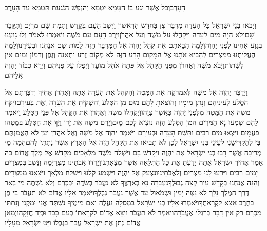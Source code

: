 \documentclass[../main/main.tex]{subfiles}
\begin{document}
\begin{multicols*}{\ncols}
הָעָרֶב\PreVerseSpace{}וְכֹל אֲשֶׁר יִגַּע בּוֹ הַטָּמֵא יִטְמָא וְהַנֶּפֶשׁ הַנֹּגַעַת תִּטְמָא עַד הָעָרֶב\OpenSection{}\par
{}וַיָּבֹאוּ בְנֵי יִשְׂרָאֵל כָּל הָעֵדָה מִדְבַּר צִן בַּחֹדֶשׁ הָרִאשׁוֹן וַיֵּשֶׁב הָעָם בְּקָדֵשׁ וַתָּמָת שָׁם מִרְיָם וַתִּקָּבֵר שָׁם\PreVerseSpace{}וְלֹא הָיָה מַיִם לָעֵדָה וַיִּקָּהֲלוּ עַל מֹשֶׁה וְעַל אַהֲרֹן\PreVerseSpace{}וַיָּרֶב הָעָם עִם מֹשֶׁה וַיֹּאמְרוּ לֵאמֹר וְלוּ גָוַעְנוּ בִּגְוַע אַחֵינוּ לִפְנֵי יַהְוֶה\PreVerseSpace{}וְלָמָה הֲבֵאתֶם אֶת קְהַל יַהְוֶה אֶל הַמִּדְבָּר הַזֶּה לָמוּת שָׁם אֲנַחְנוּ וּבְעִירֵנוּ\PreVerseSpace{}וְלָמָה הֶעֱלִיתֻנוּ מִמִּצְרַיִם לְהָבִיא אֹתָנוּ אֶל הַמָּקוֹם הָרָע הַזֶּה לֹא מְקוֹם זֶרַע וּתְאֵנָה וְגֶפֶן וְרִמּוֹן וּמַיִם אַיִן לִשְׁתּוֹת\PreVerseSpace{}וַיָּבֹא מֹשֶׁה וְאַהֲרֹן מִפְּנֵי הַקָּהָל אֶל פֶּתַח אֹהֶל מוֹעֵד וַיִּפְּלוּ עַל פְּנֵיהֶם וַיֵּרָא כְבוֹד יַהְוֶה אֲלֵיהֶם\OpenSection{}\par
{}וַיְדַבֵּר יַהְוֶה אֶל מֹשֶׁה לֵּאמֹר\PreVerseSpace{}קַח אֶת הַמַּטֶּה וְהַקְהֵל אֶת הָעֵדָה אַתָּה וְאַהֲרֹן אָחִיךָ וְדִבַּרְתֶּם אֶל הַסֶּלַע לְעֵינֵיהֶם וְנָתַן מֵימָיו וְהוֹצֵאתָ לָהֶם מַיִם מִן הַסֶּלַע וְהִשְׁקִיתָ אֶת הָעֵדָה וְאֶת בְּעִירָם\PreVerseSpace{}וַיִּקַּח מֹשֶׁה אֶת הַמַּטֶּה מִלִּפְנֵי יַהְוֶה כַּאֲשֶׁר צִוָּהוּ\PreVerseSpace{}וַיַּקְהִלוּ מֹשֶׁה וְאַהֲרֹן אֶת הַקָּהָל אֶל פְּנֵי הַסָּלַע וַיֹּאמֶר לָהֶם שִׁמְעוּ נָא הַמֹּרִים הֲמִן הַסֶּלַע הַזֶּה נוֹצִיא לָכֶם מָיִם\PreVerseSpace{}וַיָּרֶם מֹשֶׁה אֶת יָדוֹ וַיַּךְ אֶת הַסֶּלַע בְּמַטֵּהוּ פַּעֲמָיִם וַיֵּצְאוּ מַיִם רַבִּים וַתֵּשְׁתְּ הָעֵדָה וּבְעִירָם \ClosedSection{}וַיֹּאמֶר יַהְוֶה אֶל מֹשֶׁה וְאֶל אַהֲרֹן יַעַן לֹא הֶאֱמַנְתֶּם בִּי לְהַקְדִּישֵׁנִי לְעֵינֵי בְּנֵי יִשְׂרָאֵל לָכֵן לֹא תָבִיאוּ אֶת הַקָּהָל הַזֶּה אֶל הָאָרֶץ אֲשֶׁר נָתַתִּי לָהֶם\PreVerseSpace{}הֵמָּה מֵי מְרִיבָה אֲשֶׁר רָבוּ בְנֵי יִשְׂרָאֵל אֶת יַהְוֶה וַיִּקָּדֵשׁ בָּם \ClosedSection{}וַיִּשְׁלַח מֹשֶׁה מַלְאָכִים מִקָּדֵשׁ אֶל מֶלֶךְ אֱדוֹם כֹּה אָמַר אָחִיךָ יִשְׂרָאֵל אַתָּה יָדַעְתָּ אֵת כָּל הַתְּלָאָה אֲשֶׁר מְצָאָתְנוּ\PreVerseSpace{}וַיֵּרְדוּ אֲבֹתֵינוּ מִצְרַיְמָה וַנֵּשֶׁב בְּמִצְרַיִם יָמִים רַבִּים וַיָּרֵעוּ לָנוּ מִצְרַיִם וְלַאֲבֹתֵינוּ\PreVerseSpace{}וַנִּצְעַק אֶל יַהְוֶה וַיִּשְׁמַע קֹלֵנוּ וַיִּשְׁלַח מַלְאָךְ וַיֹּצִאֵנוּ מִמִּצְרָיִם וְהִנֵּה אֲנַחְנוּ בְקָדֵשׁ עִיר קְצֵה גְבוּלֶךָ\PreVerseSpace{}נַעְבְּרָה נָּא בְאַרְצֶךָ לֹא נַעֲבֹר בְּשָׂדֶה וּבְכֶרֶם וְלֹא נִשְׁתֶּה מֵי בְאֵר דֶּרֶךְ הַמֶּלֶךְ נֵלֵךְ לֹא נִטֶּה יָמִין וּשְׂמֹאול עַד אֲשֶׁר נַעֲבֹר גְּבֻלֶךָ\PreVerseSpace{}וַיֹּאמֶר אֵלָיו אֱדוֹם לֹא תַעֲבֹר בִּי פֶּן בַּחֶרֶב אֵצֵא לִקְרָאתֶךָ\PreVerseSpace{}וַיֹּאמְרוּ אֵלָיו בְּנֵי יִשְׂרָאֵל בַּמְסִלָּה נַעֲלֶה וְאִם מֵימֶיךָ נִשְׁתֶּה אֲנִי וּמִקְנַי וְנָתַתִּי מִכְרָם רַק אֵין דָּבָר בְּרַגְלַי אֶעֱבֹרָה\PreVerseSpace{}וַיֹּאמֶר לֹא תַעֲבֹר וַיֵּצֵא אֱדוֹם לִקְרָאתוֹ בְּעַם כָּבֵד וּבְיָד חֲזָקָה\PreVerseSpace{}וַיְמָאֵן אֱדוֹם נְתֹן אֶת יִשְׂרָאֵל עֲבֹר בִּגְבֻלוֹ וַיֵּט יִשְׂרָאֵל מֵעָלָיו\OpenSection{}\par

\end{multicols*}
\end{document}
